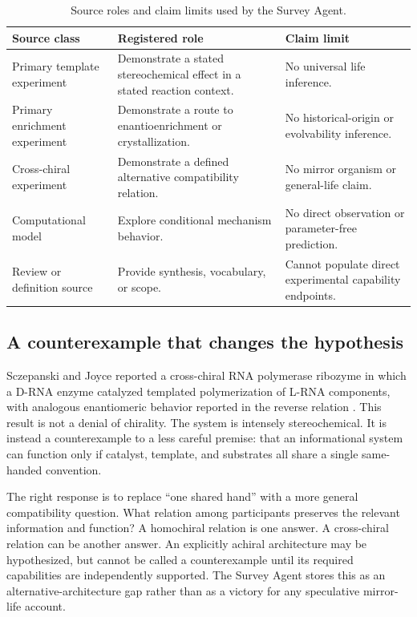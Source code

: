 \documentclass[conference]{IEEEtran}
\begin{document}
\begin{table}[!t]
\caption{Source roles and claim limits used by the Survey Agent.}
\label{tab:source-roles}
\centering
\renewcommand{\arraystretch}{1.16}
\begin{tabular}{|P{0.23\columnwidth}|P{0.25\columnwidth}|P{0.34\columnwidth}|}
\hline
\textbf{Source class} & \textbf{Registered role} & \textbf{Claim limit} \\
\hline
Primary template experiment & Demonstrate a stated stereochemical effect in a stated reaction context. & No universal life inference. \\
\hline
Primary enrichment experiment & Demonstrate a route to enantioenrichment or crystallization. & No historical-origin or evolvability inference. \\
\hline
Cross-chiral experiment & Demonstrate a defined alternative compatibility relation. & No mirror organism or general-life claim. \\
\hline
Computational model & Explore conditional mechanism behavior. & No direct observation or parameter-free prediction. \\
\hline
Review or definition source & Provide synthesis, vocabulary, or scope. & Cannot populate direct experimental capability endpoints. \\
\hline
\end{tabular}
\end{table}

\subsection{A counterexample that changes the hypothesis}

Sczepanski and Joyce reported a cross-chiral RNA polymerase ribozyme in which a D-RNA enzyme catalyzed templated polymerization of L-RNA components, with analogous enantiomeric behavior reported in the reverse relation \cite{sczepanski}. This result is not a denial of chirality. The system is intensely stereochemical. It is instead a counterexample to a less careful premise: that an informational system can function only if catalyst, template, and substrates all share a single same-handed convention.

The right response is to replace ``one shared hand'' with a more general compatibility question. What relation among participants preserves the relevant information and function? A homochiral relation is one answer. A cross-chiral relation can be another answer. An explicitly achiral architecture may be hypothesized, but cannot be called a counterexample until its required capabilities are independently supported. The Survey Agent stores this as an alternative-architecture gap rather than as a victory for any speculative mirror-life account.
\end{document}
